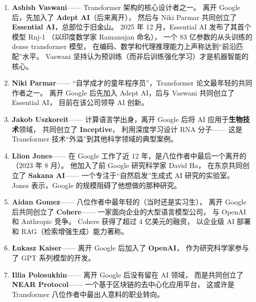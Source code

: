 \begin{enumerate}[noitemsep]
      Shazeer 被任命为 \textbf{Gemini 项目的技术主管}（与 Jeff Dean 和 Oriol Vinyals 并列）。
      回归后，他在 \textit{Fast Company} 的采访中表示：
      ``Google 拥有世界上最优秀的研究者群体，
      以及我认识、热爱并尊重的优秀领导者。
      Google 开发并拥有 LLM 革命背后的大部分技术；
      将这些技术带回给拥有它们的团队是正确的。''
      如今，这位 Transformer 的共同发明者正在领导 Google 向 AGI 的冲锋。

\item \textbf{Ashish Vaswani}——
      Transformer 架构的核心设计者之一。
      离开 Google 后，先加入了 \textbf{Adept AI}（后来离开），
      然后与 Niki Parmar 共同创立了 \textbf{Essential AI}，总部位于旧金山。
      2025 年 12 月，Essential AI 发布了其首个模型 Rnj-1
      （以印度数学家 Ramanujan 命名），
      一个 83 亿参数的从头训练的 dense transformer 模型，
      在编码、数学和代理推理能力上声称达到``前沿匹配''水平。
      Vaswani 坚持认为预训练（而非后训练强化学习）才是机器智能的核心。

\item \textbf{Niki Parmar}——
      ``自学成才的童年程序员''，Transformer 论文最年轻的共同作者之一。
      离开 Google 后先加入 Adept AI，后与 Vaswani 共同创立了 Essential AI，
      目前在该公司领导 AI 创新。

\item \textbf{Jakob Uszkoreit}——
      计算语言学出身，离开 Google 后将 AI 应用于\textbf{生物技术}领域，
      共同创立了 \textbf{Inceptive}，
      利用深度学习设计 RNA 分子——
      这是 Transformer 技术``外溢''到其他科学领域的典型案例。

\item \textbf{Llion Jones}——
      在 Google 工作了近 12 年，是八位作者中最后一个离开的
      （2023 年 8 月）。
      他加入了前 Google 研究科学家 David Ha，
      在东京共同创立了 \textbf{Sakana AI}——
      一个专注于``自然启发''生成式 AI 研究的实验室。
      Jones 表示，Google 的规模阻碍了他想做的那种研究。

\item \textbf{Aidan Gomez}——
      八位作者中最年轻的（当时还是实习生），
      离开 Google 后共同创立了 \textbf{Cohere}——
      一家面向企业的大型语言模型公司，
      与 OpenAI 和 Anthropic 竞争。
      Cohere 获得了超过 4 亿美元的融资，
      以企业级 AI 部署和 RAG（检索增强生成）能力著称。

\item \textbf{Łukasz Kaiser}——
      离开 Google 后加入了 \textbf{OpenAI}，
      作为研究科学家参与了 GPT 系列模型的开发。

\item \textbf{Illia Polosukhin}——
      离开 Google 后没有留在 AI 领域，
      而是共同创立了 \textbf{NEAR Protocol}——
      一个基于区块链的去中心化应用平台，
      这或许是 Transformer 八位作者中最出人意料的职业转向。

\end{enumerate}

